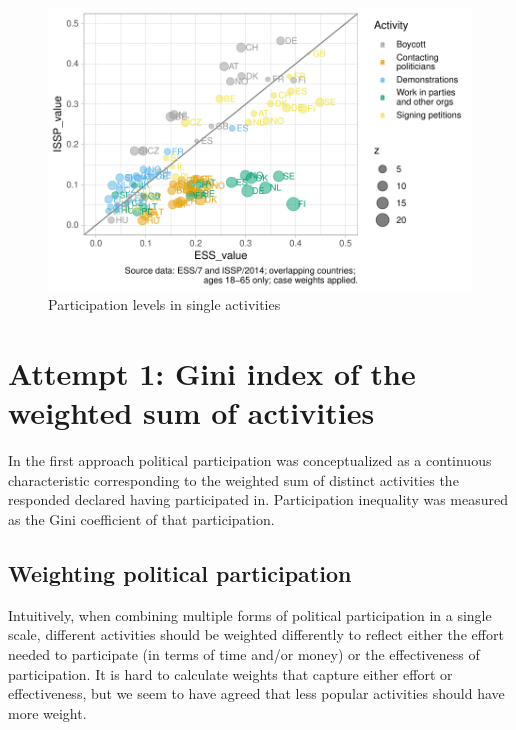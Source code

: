 \documentclass[12pt,]{article}
\begin{document}
\begin{figure}[H]

{\centering \includegraphics{report_files/figure-latex/part-rate-dot-plot-1} 

}

\caption{Participation levels in single activities}\label{fig:part-rate-dot-plot}
\end{figure}

\hypertarget{attempt-1-gini-index-of-the-weighted-sum-of-activities}{%
\section{Attempt 1: Gini index of the weighted sum of activities}\label{attempt-1-gini-index-of-the-weighted-sum-of-activities}}

In the first approach political participation was conceptualized as a continuous characteristic corresponding to the weighted sum of distinct activities the responded declared having participated in. Participation inequality was measured as the Gini coefficient of that participation.

\hypertarget{weighting-political-participation}{%
\subsection{Weighting political participation}\label{weighting-political-participation}}

Intuitively, when combining multiple forms of political participation in a single scale, different activities should be weighted differently to reflect either the effort needed to participate (in terms of time and/or money) or the effectiveness of participation. It is hard to calculate weights that capture either effort or effectiveness, but we seem to have agreed that less popular activities should have more weight.
\end{document}
